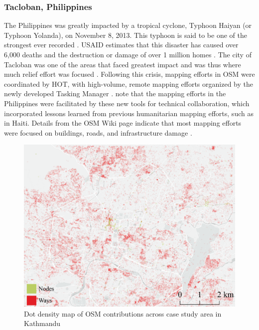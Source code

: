 \subsubsection{Tacloban, Philippines}

The Philippines was greatly impacted by a tropical cyclone, Typhoon Haiyan (or Typhoon Yolanda), on November 8, 2013. This typhoon is said to be one of the strongest ever recorded \parencite{lum_typhoon_2014}. USAID estimates that this disaster has caused over 6,000 deaths and the destruction or damage of over 1 million homes \parencite{noauthor_typhoon_2014}. The city of Tacloban was one of the areas that faced greatest impact and was thus where much relief effort was focused \parencite{lum_typhoon_2014}. Following this crisis, mapping efforts in OSM were coordinated by HOT, with high-volume, remote mapping efforts organized by the newly developed Tasking Manager \parencite{noauthor_wikiproject_2018}. \textcite{palen_success_2015} note that the mapping efforts in the Philippines were facilitated by these new tools for technical collaboration, which incorporated lessons learned from previous humanitarian mapping efforts, such as in Haiti. Details from the OSM Wiki page indicate that most mapping efforts were focused on buildings, roads, and infrastructure damage \parencite{noauthor_wikiproject_2018}. 

\begin{figure}
    \centering 
    \includegraphics[width = \textwidth]{Images/nep_map.png}
    \caption[Kathmandu dot density map]{Dot density map of OSM contributions across case study area in Kathmandu} 
    \label{fig:nep} 
\end{figure}

